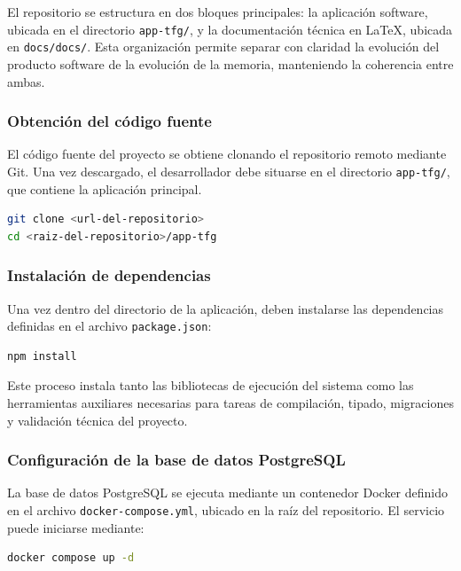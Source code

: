 El repositorio se estructura en dos bloques principales: la aplicación software, ubicada en el directorio \texttt{app-tfg/}, y la documentación técnica en \LaTeX, ubicada en \texttt{docs/docs/}. Esta organización permite separar con claridad la evolución del producto software de la evolución de la memoria, manteniendo la coherencia entre ambas.

\subsubsection*{Obtención del código fuente}

El código fuente del proyecto se obtiene clonando el repositorio remoto mediante Git. Una vez descargado, el desarrollador debe situarse en el directorio \texttt{app-tfg/}, que contiene la aplicación principal.

\begin{lstlisting}[language=bash]
git clone <url-del-repositorio>
cd <raiz-del-repositorio>/app-tfg
\end{lstlisting}

\subsubsection*{Instalación de dependencias}

Una vez dentro del directorio de la aplicación, deben instalarse las dependencias definidas en el archivo \texttt{package.json}:

\begin{lstlisting}[language=bash]
npm install
\end{lstlisting}

Este proceso instala tanto las bibliotecas de ejecución del sistema como las herramientas auxiliares necesarias para tareas de compilación, tipado, migraciones y validación técnica del proyecto.

\subsubsection*{Configuración de la base de datos PostgreSQL}

La base de datos PostgreSQL se ejecuta mediante un contenedor Docker definido en el archivo \texttt{docker-compose.yml}, ubicado en la raíz del repositorio. El servicio puede iniciarse mediante:

\begin{lstlisting}[language=bash]
docker compose up -d
\end{lstlisting}

